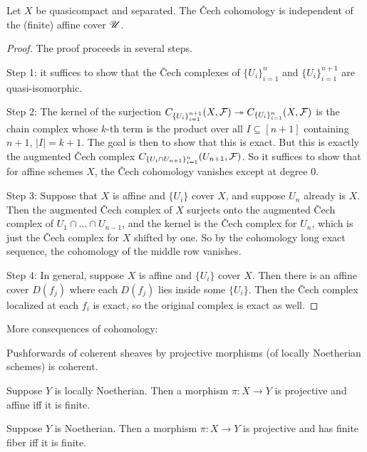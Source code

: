 \documentclass[11pt]{amsart}
\begin{document}
\begin{thm}
    Let $X$ be quasicompact and separated. The \v{C}ech cohomology is independent of the (finite) affine cover $\mathscr{U}$.
\end{thm}


\begin{proof}
    The proof proceeds in several steps.

    Step 1: it suffices to show that the \v{C}ech complexes of $\{U_i\}_{i=1}^n$ and $\{U_i\}_{i=1}^{n+1}$ are quasi-isomorphic.

    Step 2: The kernel of the surjection $C_{\{U_i\}_{i=1}^{n+1}}(X,\mathcal{F}) \twoheadrightarrow C_{\{U_i\}_{i=1}^{n}}(X,\mathcal{F})$ is the chain complex whose $k$-th term is the product over all $I\subseteq[n+1]$ containing $n+1$, $|I|= k +1$. The goal is then to show that this is exact. But this is exactly the augmented \v{C}ech complex $C_{\{U_i\cap U_{n+1}\}_{i=1}^n}(U_{n+1},\mathcal{F})$. So it suffices to show that for affine schemes $X$, the \v{C}ech cohomology vanishes except at degree 0.

    Step 3: Suppose that $X$ is affine and $\{U_i\}$ cover $X$, and suppose $U_{n}$ already is $X$. Then the augmented \v{C}ech complex of $X$ surjects onto the augmented \v{C}ech complex of $U_1\cap\dots \cap U_{n-1}$, and the kernel is the \v{C}ech complex for $U_n$, which is just the \v{C}ech complex for $X$ shifted by one. So by the cohomology long exact sequence, the cohomology of the middle row vanishes.

    Step 4: In general, suppose $X$ is affine and $\{U_i\}$ cover $X$. Then there is an affine cover $D(f_j)$ where each $D(f_j)$ lies inside some $\{U_i\}$. Then the \v{C}ech complex localized at each $f_i$ is exact, so the original complex is exact as well. 
\end{proof}

More consequences of cohomology:

\begin{prop}
    Pushforwards of coherent sheaves by projective morphisms (of locally Noetherian schemes) is coherent.
\end{prop}

\begin{prop}
    Suppose $Y$ is locally Noetherian. Then a morphism $\pi:X\to Y$ is projective and affine iff it is finite. 
\end{prop}

\begin{prop}
    Suppose $Y$ is Noetherian. Then a morphism $\pi:X\to Y$ is projective and has finite fiber iff it is finite. 
\end{prop}
\end{document}
